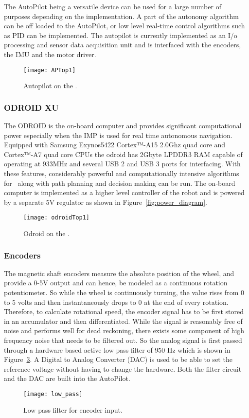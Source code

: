 The AutoPilot being a versatile device can be used for a large number of purposes depending on the implementation. A part of the autonomy algorithm can be off loaded to the AutoPilot, or low level real-time control algorithms such as PID can be implemented. The autopilot is currently implemented as an I/o processing and sensor data acquisition unit and is interfaced with the encoders, the IMU and the motor driver.

\begin{figure}
\centering
\texttt{[image: APTop1]}
\caption{Autopilot on the \imp.}
\label{fig:APTop1}
\end{figure}

\subsubsection{ODROID XU}

The ODROID is the on-board computer and provides significant computational power especially when the IMP is used for real time autonomous navigation. Equipped with Samsung Exynos5422 Cortex™-A15 2.0Ghz quad core and Cortex™-A7 quad core CPUs the odroid has 2Gbyte LPDDR3 RAM capable of operating at 933MHz and several USB 2 and USB 3 ports for interfacing. With these features, considerably powerful and computationally intensive algorithms for \slam ~along with path planning and decision making can be run. The on-board computer is implemented as a higher level controller of the robot and is powered by a separate 5V regulator as shown in Figure~\ref{fig:power_diagram}.

\begin{figure}[h!]
\centering
\texttt{[image: odroidTop1]}
	\caption{Odroid on the \imp.}
	\label{fig:odroidTop1}
\end{figure}

\subsubsection{Encoders}
The magnetic shaft encoders measure the absolute position of the wheel, and provide a 0-5V output and can hence, be modeled as a continuous rotation potentiometer. So while the wheel is continuously turning, the value rises from 0 to 5 volts and then instantaneously drops to 0 at the end of every rotation. Therefore, to calculate rotational speed, the encoder signal has to be first stored in an accumulator and then differentiated. While the signal is reasonably free of noise and performs well for dead reckoning, there exists some component of high frequency noise that needs to be filtered out. So the analog signal is first passed through a hardware based active low pass filter of 950 Hz which is shown in Figure~\ref{fig:low_pass}. A Digital to Analog Converter (DAC) is used to be able to set the reference voltage without having to change the hardware. Both the filter circuit and the DAC are built into the AutoPilot.
\begin{figure}[h]
\centering
\texttt{[image: low\_pass]}
\caption{Low pass filter for encoder input.}
\label{fig:low_pass}
\end{figure}

